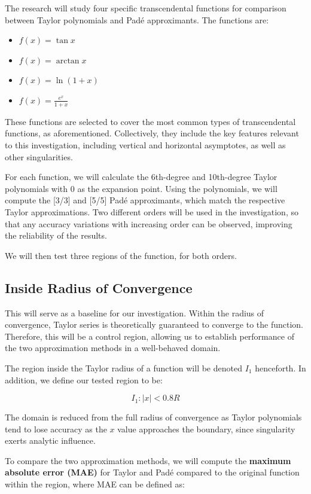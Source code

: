 \documentclass[a4paper, 12pt]{article}
\begin{document}
The research will study four specific transcendental functions for comparison between Taylor polynomials and Padé approximants. The functions are:

\begin{itemize}
  \item $f(x)=\tan x$
  \item $f(x)=\arctan x$
  \item $f(x)=\ln (1+x)$
  \item $f(x)=\frac{e^x}{1+x}$
\end{itemize}

These functions are selected to cover the most common types of transcendental functions, as aforementioned. Collectively, they include the key features relevant to this investigation, including vertical and horizontal asymptotes, as well as other singularities.

For each function, we will calculate the 6th-degree and 10th-degree Taylor polynomials with 0 as the expansion point. Using the polynomials, we will compute the [3/3] and [5/5] Padé approximants, which match the respective Taylor approximations. Two different orders will be used in the investigation, so that any accuracy variations with increasing order can be observed, improving the reliability of the results.

We will then test three regions of the function, for both orders.

\subsection{Inside Radius of Convergence}
This will serve as a baseline for our investigation. Within the radius of convergence, Taylor series is theoretically guaranteed to converge to the function. Therefore, this will be a control region, allowing us to establish performance of the two approximation methods in a well-behaved domain. 

The region inside the Taylor radius of a function will be denoted $I_1$ henceforth. In addition, we define our tested region to be:

\begin{equation*}
I_1: |x| < 0.8R
\end{equation*}

The domain is reduced from the full radius of convergence as Taylor polynomials tend to lose accuracy as the $x$ value approaches the boundary, since singularity exerts analytic influence. 

To compare the two approximation methods, we will compute the \textbf{maximum absolute error (MAE)} for Taylor and Padé compared to the original function within the region, where MAE can be defined as:
\end{document}
